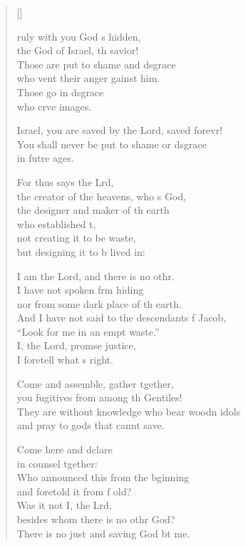 \settowidth{\versewidth}{In the Lord shall be the vindication and the glory *}
\begin{verse}[\versewidth]
  \begin{patverse}
    ruly with you God \pointup{\i}s hidden,\Med\\
the God of Israel, th savior!\\
Those are put to shame and d\pointup{\i}sgrace\Med\\
who vent their anger gainst him.\\
Those go in d\pointup{\i}sgrace\Med\\
who crve images.

Israel, you are saved by the Lord, saved forevr!\Flex\\
You shall never be put to shame or d\pointup{\i}sgrace\Med\\
in futre ages.

For thus says the Lrd,\Flex\\
the creator of the heavens, who \pointup{\i}s God,\Med\\
the designer and maker of th earth\\
who established \pointup{\i}t,\Flex\\
not creating it to be  waste,\Med\\
but designing it to b lived in:

I am the Lord, and there is no othr.\Flex\\
I have not spoken frm hiding\Med\\
nor from some dark place of th earth.\\
And I have not said to the descendants f Jacob,\Med\\
“Look for me in an empt waste.”\\
I, the Lord, prom\pointup{\i}se justice,\Med\\
I foretell what \pointup{\i}s right.

Come and assemble, gather tgether,\Med\\
you fugitives from among th Gentiles!\\
They are without knowledge who bear woodn idols\Med\\
and pray to gods that cannt save.

Come here and dclare\Med\\
in counsel tgether:\\
Who announced this from the bginning\Med\\
and foretold it from f old?\\
Was it not I, the Lrd,\Flex\\
besides whom there is no othr God?\Med\\
There is no just and saving God bt me.


\end{patverse}
\end{verse}
